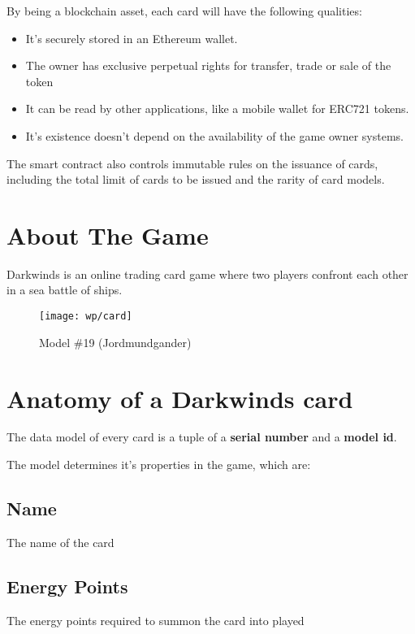 \documentclass[11pt,twocolumn]{article}
\begin{document}
By being a blockchain asset, each card will have the following qualities:

\begin{itemize}
        \item It's securely stored in an Ethereum wallet.
        \item The owner has exclusive perpetual rights for transfer, trade or sale of the token
        \item It can be read by other applications, like a mobile wallet for ERC721 tokens.
        \item It's existence doesn't depend on the availability of the game owner systems.
\end{itemize}


The smart contract also controls immutable rules on the issuance of cards, including the total limit of cards to be issued and the rarity of card models.

\clearpage
\section{About The Game}
Darkwinds is an online trading card game where two players confront each other in a sea battle of ships.\\

\clearpage

\twocolumn

\begin{figure}[!htb]
\centering 
\texttt{[image: wp/card]} 
\caption{Model \#19 (Jordmundgander)} \label{fig:A}
\end{figure}
\pagebreak
\section{Anatomy of a Darkwinds card}

The data model of every card is a tuple of a \textbf{serial number} and a \textbf{model id}.

The model determines it's properties in the game, which are:

\subsection{Name}
The name of the card

\subsection{Energy Points}
The energy points required to summon the card into played
\end{document}
